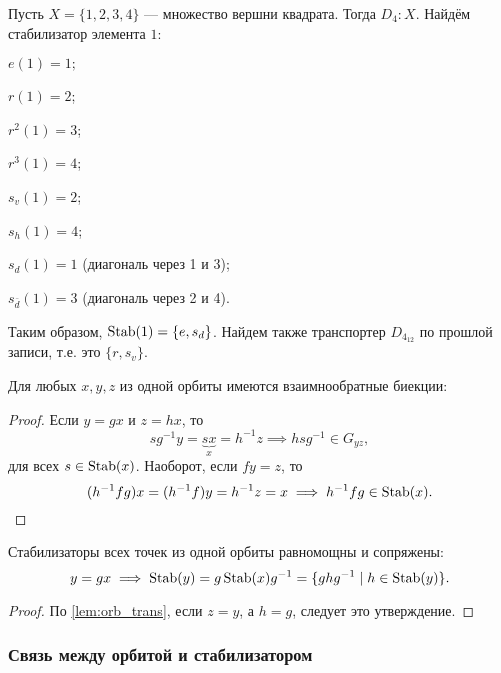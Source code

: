 \begin{example}
    Пусть $X = \{1, 2, 3, 4\}$ --- множество вершни квадрата. Тогда $D_4 \colon X$. Найдём стабилизатор элемента $1$: 
    \begin{bullets}
        \item $e(1) = 1;$
        \item $r(1) = 2$;
        \item $r^2(1) = 3$;
        \item $r^3(1) = 4$;
        \item $s_v (1) = 2$;
        \item $s_h(1) = 4$;
        \item $s_d(1) = 1$ (диагональ через 1 и 3);
        \item $s_{\bar d}(1) = 3$ (диагональ через 2 и 4).
    \end{bullets}
    Таким образом, $\operatorname{Stab}(1) = \{e, s_d\}$.
    Найдем также транспортер $D_{4_{12}}$ по прошлой записи, т.е. это $\{r, s_v\}$.
\end{example}

\begin{lemma}\label{lem:orb_trans}
    Для любых $x, y, z$ из одной орбиты имеются взаимнообратные биекции:
    \begin{center}
    \end{center}
\end{lemma}
\begin{proof}
    Если $y = gx$ и $z = hx$, то $$sg^{-1}y = \underbrace{sx}_{x} = h^{-1}z \implies hsg^{-1} \in G_{yz}, $$
    для всех $s \in \operatorname{Stab}(x)$. Наоборот, если $fy = z$, то \[
        (h^{-1}fg)x = (h^{-1}f)y = {h^{-1}}z = x \implies h^{-1}fg \in \operatorname{Stab}(x).
    \]
\end{proof}

\begin{proposition}
    Стабилизаторы всех точек из одной орбиты равномощны и сопряжены: \[
    y = gx \implies \operatorname{Stab}(y) = g \operatorname{Stab}(x) g^{-1} = \{ ghg^{-1} \mid h \in \operatorname{Stab}(y) \}.\]
    \begin{proof}
        По \cref{lem:orb_trans}, если $z = y$, а $h=g$, следует это утверждение.
    \end{proof}
\end{proposition}
\subsubsection{Связь между орбитой и стабилизатором}

